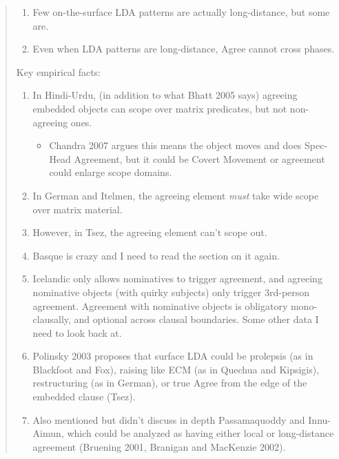 
\begin{abstract}
\begin{enumerate}
  \item Few on-the-surface LDA patterns are actually long-distance, but some are.
  \item Even when LDA patterns are long-distance, Agree cannot cross phases.
\end{enumerate}

Key empirical facts:

\begin{enumerate}
  \item In Hindi-Urdu, (in addition to what Bhatt 2005 says) agreeing embedded objects can scope over matrix predicates, but not non-agreeing ones.
  \begin{itemize}
    \item Chandra 2007 argues this means the object moves and does Spec-Head Agreement, but it could be Covert Movement or agreement could enlarge scope domains.
  \end{itemize}
  \item In German and Itelmen, the agreeing element \textit{must} take wide scope over matrix material.
  \item However, in Tsez, the agreeing element can't scope out.
  \item Basque is crazy and I need to read the section on it again.
  \item Icelandic only allows nominatives to trigger agreement, and agreeing nominative objects (with quirky subjects) only trigger 3rd-person agreement. Agreement with nominative objects is obligatory mono-clausally, and optional across clausal boundaries. Some other data I need to look back at.
  \item Polinsky 2003 proposes that surface LDA could be prolepsis (as in Blackfoot and Fox), raising like ECM (as in Quechua and Kipsigis), restructuring (as in German), or true Agree from the edge of the embedded clause (Tsez).
  \item Also mentioned but didn't discuss in depth Passamaquoddy and Innu-Aimun, which could be analyzed as having either local or long-distance agreement (Bruening 2001, Branigan and MacKenzie 2002).
\end{enumerate}
\end{abstract}
